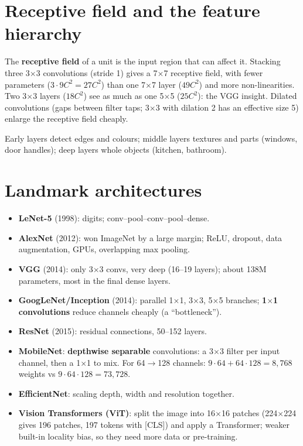 \section{Receptive field and the feature hierarchy}
The \textbf{receptive field} of a unit is the input region that can affect it. Stacking three 3$\times$3 convolutions (stride 1) gives a 7$\times$7 receptive
field, with fewer parameters ($3\cdot9C^2 = 27C^2$) than one 7$\times$7 layer ($49C^2$) and more non-linearities. Two 3$\times$3 layers ($18C^2$) see as much as
one 5$\times$5 ($25C^2$): the VGG insight. Dilated convolutions (gaps between filter taps; 3$\times$3 with dilation 2 has an effective size 5) enlarge the
receptive field cheaply.

Early layers detect edges and colours; middle layers textures and parts (windows, door handles); deep layers whole objects (kitchen, bathroom).

\section{Landmark architectures}
\begin{itemize}
\item \textbf{LeNet-5} (1998): digits; conv--pool--conv--pool--dense.
\item \textbf{AlexNet} (2012): won ImageNet by a large margin; ReLU, dropout, data augmentation, GPUs, overlapping max pooling.
\item \textbf{VGG} (2014): only 3$\times$3 convs, very deep (16--19 layers); about 138M parameters, most in the final dense layers.
\item \textbf{GoogLeNet/Inception} (2014): parallel 1$\times$1, 3$\times$3, 5$\times$5 branches; \textbf{1$\times$1 convolutions} reduce channels cheaply (a ``bottleneck'').
\item \textbf{ResNet} (2015): residual connections, 50--152 layers.
\item \textbf{MobileNet}: \textbf{depthwise separable} convolutions: a 3$\times$3 filter per input channel, then a 1$\times$1 to mix. For 64$\to$128 channels:
  $9\cdot64 + 64\cdot128 = 8{,}768$ weights vs $9\cdot64\cdot128 = 73{,}728$.
\item \textbf{EfficientNet}: scaling depth, width and resolution together.
\item \textbf{Vision Transformers (ViT)}: split the image into 16$\times$16 patches (224$\times$224 gives 196 patches, 197 tokens with [CLS]) and apply a
  Transformer; weaker built-in locality bias, so they need more data or pre-training.
\end{itemize}

